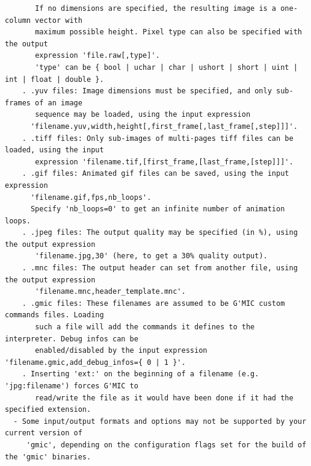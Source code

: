 \documentclass[a4paper,11pt,twoside]{book}
\begin{document}
\begin{lstlisting}
       If no dimensions are specified, the resulting image is a one-column vector with 
       maximum possible height. Pixel type can also be specified with the output 
       expression 'file.raw[,type]'. 
       'type' can be { bool | uchar | char | ushort | short | uint | int | float | double }. 
    . .yuv files: Image dimensions must be specified, and only sub-frames of an image 
       sequence may be loaded, using the input expression 
      'filename.yuv,width,height[,first_frame[,last_frame[,step]]]'. 
    . .tiff files: Only sub-images of multi-pages tiff files can be loaded, using the input 
       expression 'filename.tif,[first_frame,[last_frame,[step]]]'. 
    . .gif files: Animated gif files can be saved, using the input expression 
      'filename.gif,fps,nb_loops'. 
      Specify 'nb_loops=0' to get an infinite number of animation loops. 
    . .jpeg files: The output quality may be specified (in %), using the output expression 
       'filename.jpg,30' (here, to get a 30% quality output). 
    . .mnc files: The output header can set from another file, using the output expression 
       'filename.mnc,header_template.mnc'. 
    . .gmic files: These filenames are assumed to be G'MIC custom commands files. Loading 
       such a file will add the commands it defines to the interpreter. Debug infos can be 
       enabled/disabled by the input expression 'filename.gmic,add_debug_infos={ 0 | 1 }'. 
    . Inserting 'ext:' on the beginning of a filename (e.g. 'jpg:filename') forces G'MIC to 
       read/write the file as it would have been done if it had the specified extension. 
  - Some input/output formats and options may not be supported by your current version of 
     'gmic', depending on the configuration flags set for the build of the 'gmic' binaries.
\end{lstlisting}
\normalsize
\end{document}
